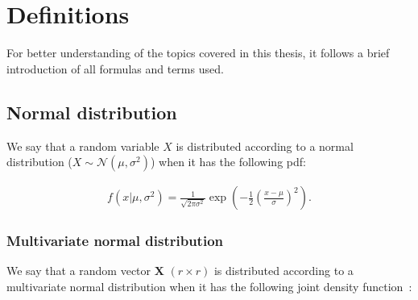 \chapter{Definitions}\label{ch:definitions}

For better understanding of the topics covered in this thesis,
it follows a brief introduction of all formulas and terms used.


\section{Normal distribution}\label{sec:normal-distribution}

We say that a random variable $X$ is distributed
according to a normal distribution ($X \sim \mathcal{N}(\mu, \sigma^2)$) when it has the following \gls{pdf}:

\begin{definition}
    \begin{align}
        \label{eq:pdf_normal_dist}
        f(x|\mu, \sigma^2) = \frac{1}{\sqrt{2\pi\sigma^2}}
        \exp{\left(-\frac{1}{2}\left(\frac{x-\mu}{\sigma}\right)^2\right)}.
    \end{align}
\end{definition}

\subsection{Multivariate normal distribution}\label{subsec:multivariate-normal-distribution}

We say that a random vector $\bm{X}$ $(r \times r)$
is distributed according to a multivariate normal distribution
when it has the following joint density function~\autocite[p. 59]{izenman_modern_2008}:

